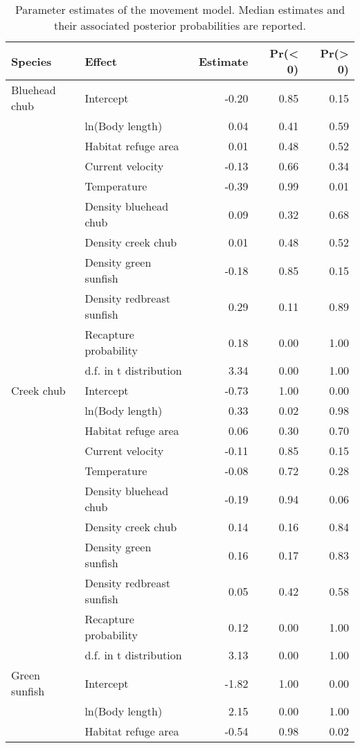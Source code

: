 \begin{table}[ht]
\centering
\caption{Parameter estimates of the movement model. Median estimates and their associated posterior probabilities are reported.} 
\label{tab:coefficients}
\begin{tabular}{llrrr}
  \hline
Species & Effect & Estimate & Pr(< 0) & Pr(> 0) \\ 
  \hline
Bluehead chub & Intercept & -0.20 & 0.85 & 0.15 \\ 
   & ln(Body length) & 0.04 & 0.41 & 0.59 \\ 
   & Habitat refuge area & 0.01 & 0.48 & 0.52 \\ 
   & Current velocity & -0.13 & 0.66 & 0.34 \\ 
   & Temperature & -0.39 & 0.99 & 0.01 \\ 
   & Density bluehead chub & 0.09 & 0.32 & 0.68 \\ 
   & Density creek chub & 0.01 & 0.48 & 0.52 \\ 
   & Density green sunfish & -0.18 & 0.85 & 0.15 \\ 
   & Density redbreast sunfish & 0.29 & 0.11 & 0.89 \\ 
   & Recapture probability & 0.18 & 0.00 & 1.00 \\ 
   & d.f. in t distribution & 3.34 & 0.00 & 1.00 \\ 
  Creek chub & Intercept & -0.73 & 1.00 & 0.00 \\ 
   & ln(Body length) & 0.33 & 0.02 & 0.98 \\ 
   & Habitat refuge area & 0.06 & 0.30 & 0.70 \\ 
   & Current velocity & -0.11 & 0.85 & 0.15 \\ 
   & Temperature & -0.08 & 0.72 & 0.28 \\ 
   & Density bluehead chub & -0.19 & 0.94 & 0.06 \\ 
   & Density creek chub & 0.14 & 0.16 & 0.84 \\ 
   & Density green sunfish & 0.16 & 0.17 & 0.83 \\ 
   & Density redbreast sunfish & 0.05 & 0.42 & 0.58 \\ 
   & Recapture probability & 0.12 & 0.00 & 1.00 \\ 
   & d.f. in t distribution & 3.13 & 0.00 & 1.00 \\ 
  Green sunfish & Intercept & -1.82 & 1.00 & 0.00 \\ 
   & ln(Body length) & 2.15 & 0.00 & 1.00 \\ 
   & Habitat refuge area & -0.54 & 0.98 & 0.02 \\ 

\end{tabular}
\end{table}
